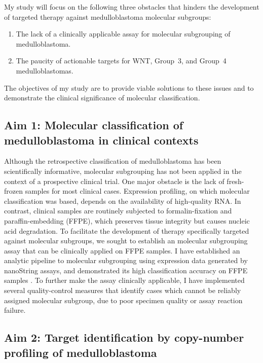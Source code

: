 \documentclass[11pt,letterpaper]{article}
\theoremstyle{definition}
\begin{document}
My study will focus on the following three obstacles that hinders the development of targeted therapy against medulloblastoma molecular subgroups:

\begin{enumerate}
	\item The lack of a clinically applicable assay for molecular subgrouping of medulloblastoma.
	\item The paucity of actionable targets for WNT, Group~3, and Group~4 medulloblastomas.
\end{enumerate}

The objectives of my study are to provide viable solutions to these issues and to demonstrate the clinical significance of molecular classification.

\subsection{Aim 1: Molecular classification of medulloblastoma in clinical contexts}

Although the retrospective classification of medulloblastoma has been scientifically informative, molecular subgrouping has not been applied in the context of a prospective clinical trial. One major obstacle is the lack of fresh-frozen samples for most clinical cases. Expression profiling, on which molecular classification was based, depends on the availability of high-quality RNA. In contrast, clinical samples are routinely subjected to formalin-fixation and paraffin-embedding (FFPE), which preserves tissue integrity but causes nucleic acid degradation. To facilitate the development of therapy specifically targeted against molecular subgroups, we sought to establish an molecular subgrouping assay that can be clinically applied on FFPE samples. I have established an analytic pipeline to molecular subgrouping using expression data generated by nanoString assays, and demonstrated its high classification accuracy on FFPE samples . To further make the assay clinically applicable, I have implemented several quality-control measures that identify cases which cannot be reliably assigned molecular subgroup, due to poor specimen quality or assay reaction failure.

\subsection{Aim 2: Target identification by copy-number profiling of medulloblastoma}
\end{document}
